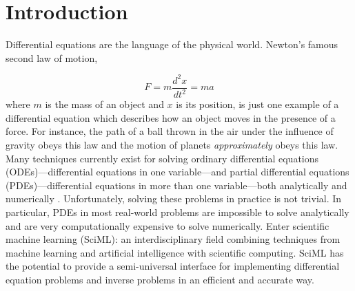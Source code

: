 \documentclass{CUP-JNL-DTM}%
\theoremstyle{definition}
\numberwithin{equation}{section}
\begin{document}
\vspace{-0.2cm}
\localtableofcontents


\section{Introduction}

Differential equations are the language of the physical world. Newton's famous second law of motion, 

\begin{equation}
    F = m\frac{d^2x}{dt^2} = ma
\end{equation}
where $m$ is the mass of an object and $x$ is its position, is just one example of a differential equation which describes how an object moves in the presence of a force. For instance, the path of a ball thrown in the air under the influence of gravity obeys this law and the motion of planets \textit{approximately} obeys this law. Many techniques currently exist for solving ordinary differential equations (ODEs)---differential equations in one variable---and partial differential equations (PDEs)---differential equations in more than one variable---both analytically \cite{evansPartialDifferentialEquations2010} and numerically \cite{davidcookStrengtheningComputationUndergraduate2007}. Unfortunately, solving these problems in practice is not trivial. In particular, PDEs in most real-world problems are impossible to solve analytically and are very computationally expensive to solve numerically. Enter scientific machine learning (SciML): an interdisciplinary field combining techniques from machine learning and artificial intelligence with scientific computing. SciML has the potential to provide a semi-universal interface for implementing differential equation problems and inverse problems in an efficient and accurate way. 
\end{document}
